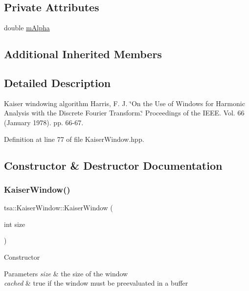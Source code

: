 \subsection*{Private Attributes}
\begin{DoxyCompactItemize}
\item 
double \hyperlink{classtsa_1_1_kaiser_window_a92c5708ea950eaf9845b13f2272cf43f}{m\+Alpha}
\end{DoxyCompactItemize}
\subsection*{Additional Inherited Members}


\subsection{Detailed Description}
Kaiser windowing algorithm Harris, F. J. \char`\"{}\+On the Use of Windows for Harmonic Analysis with the Discrete Fourier Transform.\char`\"{} Proceedings of the I\+E\+EE. Vol. 66 (January 1978). pp. 66-\/67. 

Definition at line 77 of file Kaiser\+Window.\+hpp.



\subsection{Constructor \& Destructor Documentation}
\mbox{\label{classtsa_1_1_kaiser_window_a1435f80a21b198c05d60be076fa152b1}} 
\subsubsection{\texorpdfstring{Kaiser\+Window()}{KaiserWindow()}\hspace{0.1cm}{\footnotesize\ttfamily [1/2]}}
{\footnotesize\ttfamily tsa\+::\+Kaiser\+Window\+::\+Kaiser\+Window (\begin{DoxyParamCaption}\item[{int}]{size }\end{DoxyParamCaption})\hspace{0.3cm}{\ttfamily [inline]}}

Constructor


\begin{DoxyParams}{Parameters}
{\em size} & the size of the window \\
\hline
{\em cached} & true if the window must be preevaluated in a buffer \\
\hline
\end{DoxyParams}


